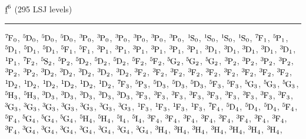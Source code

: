 \begin{mdframed}
\begin{center}
$\forb^{6}$
(295 LSJ levels)
\vspace{0.25cm}
\hrule
\vspace{0.25cm}

$\LSJterm{7}{F}{0}$, $\LSJterm{5}{D}{0}$, $\LSJterm{5}{D}{0}$, $\LSJterm{5}{D}{0}$, $\LSJterm{3}{P}{0}$, $\LSJterm{3}{P}{0}$, $\LSJterm{3}{P}{0}$, $\LSJterm{3}{P}{0}$, $\LSJterm{3}{P}{0}$, $\LSJterm{3}{P}{0}$, $\LSJterm{1}{S}{0}$, $\LSJterm{1}{S}{0}$, $\LSJterm{1}{S}{0}$, $\LSJterm{1}{S}{0}$, $\LSJterm{7}{F}{1}$, $\LSJterm{5}{P}{1}$, $\LSJterm{5}{D}{1}$, $\LSJterm{5}{D}{1}$, $\LSJterm{5}{D}{1}$, $\LSJterm{5}{F}{1}$, $\LSJterm{5}{F}{1}$, $\LSJterm{3}{P}{1}$, $\LSJterm{3}{P}{1}$, $\LSJterm{3}{P}{1}$, $\LSJterm{3}{P}{1}$, $\LSJterm{3}{P}{1}$, $\LSJterm{3}{P}{1}$, $\LSJterm{3}{D}{1}$, $\LSJterm{3}{D}{1}$, $\LSJterm{3}{D}{1}$, $\LSJterm{3}{D}{1}$, $\LSJterm{3}{D}{1}$, $\LSJterm{1}{P}{1}$, $\LSJterm{7}{F}{2}$, $\LSJterm{5}{S}{2}$, $\LSJterm{5}{P}{2}$, $\LSJterm{5}{D}{2}$, $\LSJterm{5}{D}{2}$, $\LSJterm{5}{D}{2}$, $\LSJterm{5}{F}{2}$, $\LSJterm{5}{F}{2}$, $\LSJterm{5}{G}{2}$, $\LSJterm{5}{G}{2}$, $\LSJterm{5}{G}{2}$, $\LSJterm{3}{P}{2}$, $\LSJterm{3}{P}{2}$, $\LSJterm{3}{P}{2}$, $\LSJterm{3}{P}{2}$, $\LSJterm{3}{P}{2}$, $\LSJterm{3}{P}{2}$, $\LSJterm{3}{D}{2}$, $\LSJterm{3}{D}{2}$, $\LSJterm{3}{D}{2}$, $\LSJterm{3}{D}{2}$, $\LSJterm{3}{D}{2}$, $\LSJterm{3}{F}{2}$, $\LSJterm{3}{F}{2}$, $\LSJterm{3}{F}{2}$, $\LSJterm{3}{F}{2}$, $\LSJterm{3}{F}{2}$, $\LSJterm{3}{F}{2}$, $\LSJterm{3}{F}{2}$, $\LSJterm{3}{F}{2}$, $\LSJterm{3}{F}{2}$, $\LSJterm{1}{D}{2}$, $\LSJterm{1}{D}{2}$, $\LSJterm{1}{D}{2}$, $\LSJterm{1}{D}{2}$, $\LSJterm{1}{D}{2}$, $\LSJterm{1}{D}{2}$, $\LSJterm{7}{F}{3}$, $\LSJterm{5}{P}{3}$, $\LSJterm{5}{D}{3}$, $\LSJterm{5}{D}{3}$, $\LSJterm{5}{D}{3}$, $\LSJterm{5}{F}{3}$, $\LSJterm{5}{F}{3}$, $\LSJterm{5}{G}{3}$, $\LSJterm{5}{G}{3}$, $\LSJterm{5}{G}{3}$, $\LSJterm{5}{H}{3}$, $\LSJterm{5}{H}{3}$, $\LSJterm{3}{D}{3}$, $\LSJterm{3}{D}{3}$, $\LSJterm{3}{D}{3}$, $\LSJterm{3}{D}{3}$, $\LSJterm{3}{D}{3}$, $\LSJterm{3}{F}{3}$, $\LSJterm{3}{F}{3}$, $\LSJterm{3}{F}{3}$, $\LSJterm{3}{F}{3}$, $\LSJterm{3}{F}{3}$, $\LSJterm{3}{F}{3}$, $\LSJterm{3}{F}{3}$, $\LSJterm{3}{F}{3}$, $\LSJterm{3}{F}{3}$, $\LSJterm{3}{G}{3}$, $\LSJterm{3}{G}{3}$, $\LSJterm{3}{G}{3}$, $\LSJterm{3}{G}{3}$, $\LSJterm{3}{G}{3}$, $\LSJterm{3}{G}{3}$, $\LSJterm{3}{G}{3}$, $\LSJterm{1}{F}{3}$, $\LSJterm{1}{F}{3}$, $\LSJterm{1}{F}{3}$, $\LSJterm{1}{F}{3}$, $\LSJterm{7}{F}{4}$, $\LSJterm{5}{D}{4}$, $\LSJterm{5}{D}{4}$, $\LSJterm{5}{D}{4}$, $\LSJterm{5}{F}{4}$, $\LSJterm{5}{F}{4}$, $\LSJterm{5}{G}{4}$, $\LSJterm{5}{G}{4}$, $\LSJterm{5}{G}{4}$, $\LSJterm{5}{H}{4}$, $\LSJterm{5}{H}{4}$, $\LSJterm{5}{I}{4}$, $\LSJterm{5}{I}{4}$, $\LSJterm{3}{F}{4}$, $\LSJterm{3}{F}{4}$, $\LSJterm{3}{F}{4}$, $\LSJterm{3}{F}{4}$, $\LSJterm{3}{F}{4}$, $\LSJterm{3}{F}{4}$, $\LSJterm{3}{F}{4}$, $\LSJterm{3}{F}{4}$, $\LSJterm{3}{F}{4}$, $\LSJterm{3}{G}{4}$, $\LSJterm{3}{G}{4}$, $\LSJterm{3}{G}{4}$, $\LSJterm{3}{G}{4}$, $\LSJterm{3}{G}{4}$, $\LSJterm{3}{G}{4}$, $\LSJterm{3}{G}{4}$, $\LSJterm{3}{H}{4}$, $\LSJterm{3}{H}{4}$, $\LSJterm{3}{H}{4}$, $\LSJterm{3}{H}{4}$, $\LSJterm{3}{H}{4}$, $\LSJterm{3}{H}{4}$, $\LSJterm{3}{H}{4}$, 
\end{center}
\end{mdframed}
